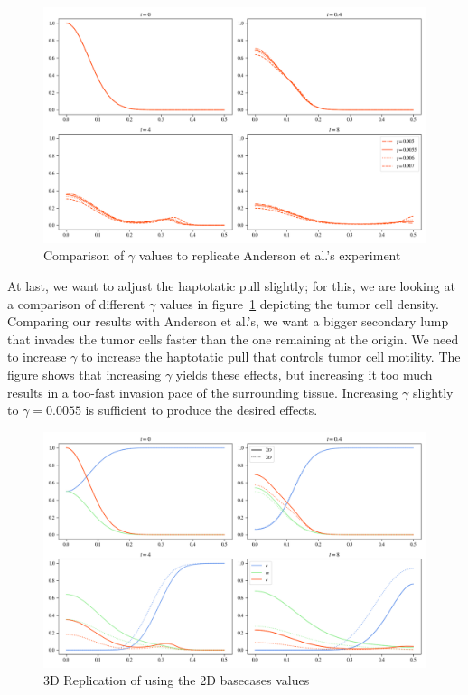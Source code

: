 \begin{figure}[!htb]
 \centering
 \includegraphics[width=\textwidth]{resources/images/gamma_comparison.png}
 \caption{Comparison of $\gamma$ values to replicate Anderson et al.'s experiment}
 \label{fig:replication_gamma_comparison}
\end{figure}

At last, we want to adjust the haptotatic pull slightly; for this, we are looking at a comparison of different $\gamma$ values in figure~\ref{fig:replication_gamma_comparison} depicting the tumor cell density. Comparing our results with Anderson et al.'s, we want a bigger secondary lump that invades the tumor cells faster than the one remaining at the origin. We need to increase $\gamma$ to increase the haptotatic pull that controls tumor cell motility. The figure shows that increasing $\gamma$ yields these effects, but increasing it too much results in a too-fast invasion pace of the surrounding tissue. Increasing $\gamma$ slightly to $\gamma=0.0055$ is sufficient to produce the desired effects.

\begin{figure}[h!]
    \centering
    \includegraphics[width=\textwidth]{resources/images/2D_without_proliferation_replication_3D.png}
    \caption{3D Replication of using the 2D basecases values}
    \label{fig:2D_proliferation_replication_3D}
\end{figure}

